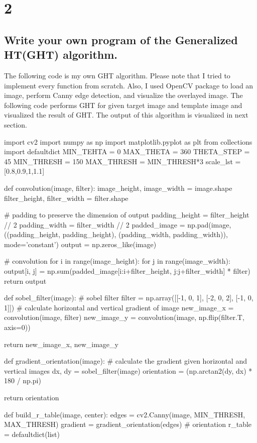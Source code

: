 \documentclass[10pt]{article}
\begin{document}
\section*{2}
\subsection*{Write your own program of the Generalized HT(GHT) algorithm.}
The following code is my own GHT algorithm. Please note that I tried to implement every function from scratch. 
Also, I used OpenCV package to load an image, perform Canny edge detection, and visualize the overlayed image. The following code performs GHT for given target image and template image and visualized the result of GHT.
The output of this algorithm is visualized in next section.

\begin{python}
import cv2
import numpy as np
import matplotlib.pyplot as plt
from collections import defaultdict
MIN_TEHTA = 0
MAX_THETA = 360
THETA_STEP = 45
MIN_THRESH = 150
MAX_THRESH = MIN_THRESH*3
scale_lst = [0.8,0.9,1,1.1]

def convolution(image, filter):
    image_height, image_width = image.shape
    filter_height, filter_width = filter.shape

    # padding to preserve the dimension of output
    padding_height = filter_height // 2
    padding_width = filter_width // 2
    padded_image = np.pad(image, ((padding_height, padding_height), (padding_width, padding_width)), mode='constant')
    output = np.zeros_like(image)

    # convolution
    for i in range(image_height):
        for j in range(image_width):
            output[i, j] = np.sum(padded_image[i:i+filter_height, j:j+filter_width] * filter)
    return output

def sobel_filter(image):
    # sobel filter
    filter = np.array([[-1, 0, 1], [-2, 0, 2], [-1, 0, 1]])
    # calculate horizontal and vertical gradient of image
    new_image_x = convolution(image, filter)
    new_image_y = convolution(image, np.flip(filter.T, axis=0))

    return new_image_x, new_image_y

def gradient_orientation(image):
    # calculate the gradient given horizontal and vertical images
    dx, dy = sobel_filter(image)
    orientation = (np.arctan2(dy, dx) * 180 / np.pi) %

    return orientation

def build_r_table(image, center):
    edges = cv2.Canny(image, MIN_THRESH, MAX_THRESH)
    gradient = gradient_orientation(edges)  # orientation
    r_table = defaultdict(list)


\end{python}
\end{document}
